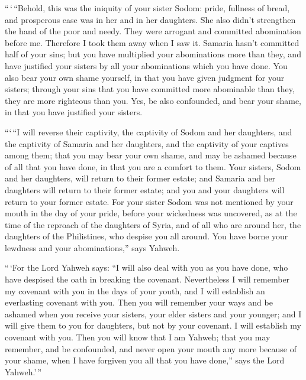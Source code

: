  ``\,`\,``Behold, this was the iniquity of your sister
Sodom: pride, fullness of bread, and prosperous ease was in her and in
her daughters. She also didn't strengthen the hand of the poor and
needy.  They were arrogant and committed abomination before
me. Therefore I took them away when I saw it.  Samaria
hasn't committed half of your sins; but you have multiplied your
abominations more than they, and have justified your sisters by all your
abominations which you have done.  You also bear your own
shame yourself, in that you have given judgment for your sisters;
through your sins that you have committed more abominable than they,
they are more righteous than you. Yes, be also confounded, and bear your
shame, in that you have justified your sisters.

 ```\,``I will reverse their captivity, the captivity of
Sodom and her daughters, and the captivity of Samaria and her daughters,
and the captivity of your captives among them;  that you
may bear your own shame, and may be ashamed because of all that you have
done, in that you are a comfort to them.  Your sisters,
Sodom and her daughters, will return to their former estate; and Samaria
and her daughters will return to their former estate; and you and your
daughters will return to your former estate.  For your
sister Sodom was not mentioned by your mouth in the day of your pride,
 before your wickedness was uncovered, as at the time of
the reproach of the daughters of Syria, and of all who are around her,
the daughters of the Philistines, who despise you all around.
 You have borne your lewdness and your abominations,'' says
Yahweh.

 ``\,`For the Lord Yahweh says: ``I will also deal with you
as you have done, who have despised the oath in breaking the covenant.
 Nevertheless I will remember my covenant with you in the
days of your youth, and I will establish an everlasting covenant with
you.  Then you will remember your ways and be ashamed when
you receive your sisters, your elder sisters and your younger; and I
will give them to you for daughters, but not by your covenant.
 I will establish my covenant with you. Then you will know
that I am Yahweh;  that you may remember, and be
confounded, and never open your mouth any more because of your shame,
when I have forgiven you all that you have done,'' says the Lord
Yahweh.'\,''

